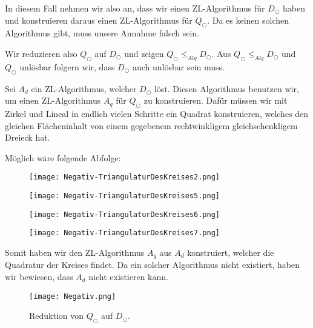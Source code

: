 \documentclass[
	12pt, %
	german, %
]{fphw}
\begin{document}
In diesem Fall nehmen wir also an, dass wir einen ZL-Algorithmus für \(D_{\bigcirc}\) haben und konstruieren daraus einen ZL-Algorithmus für \(Q_{\bigcirc}\). Da es keinen solchen Algorithmus gibt, muss unsere Annahme falsch sein.

Wir reduzieren also \(Q_{\bigcirc}\) auf \(D_{\bigcirc}\) und zeigen \(Q_{\bigcirc} \leq_{Alg} D_{\bigcirc}\). Aus \(Q_{\bigcirc} \leq_{Alg} D_{\bigcirc}\) und \(Q_{\bigcirc}\) unlösbar folgern wir, dass \(D_{\bigcirc}\) auch unlösbar sein muss.

Sei \(A_d\) ein ZL-Algorithmus, welcher \(D_{\bigcirc}\) löst. Diesen Algorithmus benutzen wir, um einen ZL-Algorithmus \(A_q\) für \(Q_{\bigcirc}\) zu konstruieren. Dafür müssen wir mit Zirkel und Lineal in endlich vielen Schritte ein Quadrat konstruieren, welches den gleichen Flächeninhalt von einem gegebenem rechtwinkligem gleichschenkligem Dreieck hat.

Möglich wäre folgende Abfolge:
\begin{figure}[H]
	\centering
	\texttt{[image: Negativ-TriangulaturDesKreises2.png]}
\end{figure}
\begin{figure}[H]
	\centering
	\texttt{[image: Negativ-TriangulaturDesKreises5.png]}
\end{figure}\begin{figure}[H]
	\centering
	\texttt{[image: Negativ-TriangulaturDesKreises6.png]}
\end{figure}\begin{figure}[H]
	\centering
	\texttt{[image: Negativ-TriangulaturDesKreises7.png]}
\end{figure}

Somit haben wir den ZL-Algorithmus \(A_q\) aus \(A_d\) konstruiert, welcher die Quadratur der Kreises findet. Da ein solcher Algorithmus nicht existiert, haben wir bewiesen, dass \(A_d\) nicht existieren kann.
\begin{figure}[H]
	\centering
	\texttt{[image: Negativ.png]}
	\caption{Reduktion von \(Q_{\bigcirc}\) auf \(D_{\bigcirc}\).}
\end{figure}
\end{document}
